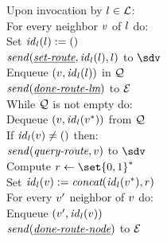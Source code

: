 \begin{figure*}[htb]
\begin{center}
{\begin{minipage}[t]{0.33\textwidth}
{		\quad Upon invocation by $l \in \mathcal{L}$:\\
		\quad For every neighbor $v$ of $l$ do:\\
		\quad Set $\mathit{id}_{l}(l) := ()$\\
		\quad \quad $\mathit{send}(\underline{\textit{set-}}\underline{\textit{route}}, \mathit{id}_{l}(l), l)$ to $\sdv$\\
		\quad \quad Enqueue $(v, \mathit{id}_{l}(l))$ in $\mathcal{Q}$\\
		\quad $\mathit{send}(\underline{\textit{done-}}\underline{\textit{route-}}\underline{\textit{lm}})$ to $\mathcal{E}$\\
		\quad While $\mathcal{Q}$ is not empty do:\\
		\quad \quad Dequeue $(v, \mathit{id}_{l}(v^*))$ from $\mathcal{Q}$\\
		\quad \quad If $\mathit{id}_{l}(v) \neq ()$ then:\\
		\quad \quad \quad $\mathit{send}(\textit{query-}\textit{route}, v)$ to $\sdv$\\
		\quad \quad \quad Compute $r \gets \set{0,1}^*$ \\
		\quad \quad \quad Set $\mathit{id}_{l}(v) := \textit{concat}(\mathit{id}_{l}(v^*), r) $\\
		\quad \quad \quad For every $v'$ neighbor of $v$ do:\\
		\quad \quad \quad \quad Enqueue $(v', \mathit{id}_{l}(v))$\\
		\quad \quad $\mathit{send}(\underline{\textit{done-}}\underline{\textit{route-}}\underline{\textit{node}})$ to $\mathcal{E}$	
}
\end{minipage}}
\end{center}
\end{figure*}
